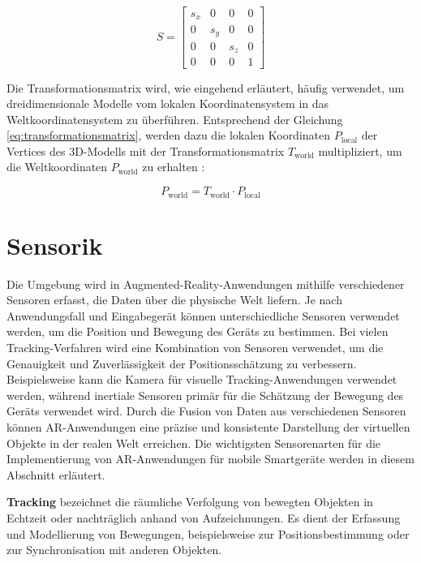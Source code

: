 \begin{equation}
    S = 
    \begin{bmatrix} 
        s_x & 0 & 0 & 0 \\ 
        0 & s_y & 0 & 0 \\ 
        0 & 0 & s_z & 0 \\ 
        0 & 0 & 0 & 1 
    \end{bmatrix}
\end{equation}

Die Transformationsmatrix wird, wie eingehend erläutert, häufig verwendet, um dreidimensionale Modelle vom lokalen Koordinatensystem in das Weltkoordinatensystem zu überführen. Entsprechend der Gleichung \ref{eq:transformationsmatrix}, werden dazu die lokalen Koordinaten \( P_{\text{local}} \) der Vertices des 3D-Modells mit der Transformationsmatrix \( T_{\text{world}} \) multipliziert, um die Weltkoordinaten \( P_{\text{world}} \) zu erhalten \cite{doerner2022virtual, gao2021vSLAM, freescale2010math3d}:

\begin{equation}
    P_{\text{world}} = T_{\text{world}} \cdot P_{\text{local}}
\end{equation}

\section{Sensorik}

Die Umgebung wird in Augmented-Reality-Anwendungen mithilfe verschiedener Sensoren erfasst, die Daten über die physische Welt liefern. Je nach Anwendungsfall und Eingabegerät können unterschiedliche Sensoren verwendet werden, um die Position und Bewegung des Geräts zu bestimmen. Bei vielen Tracking-Verfahren wird eine Kombination von Sensoren verwendet, um die Genauigkeit und Zuverlässigkeit der Positionsschätzung zu verbessern. Beispielsweise kann die Kamera für visuelle Tracking-Anwendungen verwendet werden, während inertiale Sensoren primär für die Schätzung der Bewegung des Geräts verwendet wird. Durch die Fusion von Daten aus verschiedenen Sensoren können AR-Anwendungen eine präzise und konsistente Darstellung der virtuellen Objekte in der realen Welt erreichen. Die wichtigsten Sensorenarten für die Implementierung von AR-Anwendungen für mobile Smartgeräte werden in diesem Abschnitt erläutert. \cite{doerner2022virtual}

\begin{tcolorbox}[colback=THAi-Blue!20!white, colframe=THAi-Blue]
    \textbf{Tracking} bezeichnet die räumliche Verfolgung von bewegten Objekten in Echtzeit oder nachträglich anhand von Aufzeichnungen. Es dient der Erfassung und Modellierung von Bewegungen, beispielsweise zur Positionsbestimmung oder zur Synchronisation mit anderen Objekten. \cite{wikipedia2024tracking}
\end{tcolorbox}  

